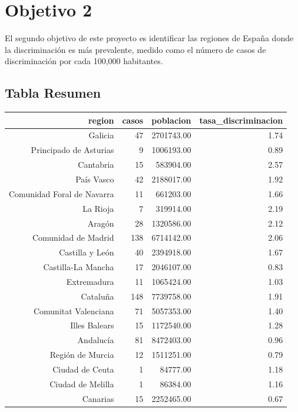 \documentclass{article}
\begin{document}
\section{Objetivo 2}
El segundo objetivo de este proyecto es identificar las regiones de España donde la discriminación es más prevalente, medido como el número de casos de discriminación por cada 100,000 habitantes.

\subsection{Tabla Resumen}
\begin{table}[ht]
\centering
\begin{tabular}{rrrr}
  \hline
region & casos & poblacion & tasa\_discriminacion \\ 
  \hline
Galicia &  47 & 2701743.00 & 1.74 \\ 
  Principado de Asturias &   9 & 1006193.00 & 0.89 \\ 
  Cantabria &  15 & 583904.00 & 2.57 \\ 
  País Vasco &  42 & 2188017.00 & 1.92 \\ 
  Comunidad Foral de Navarra &  11 & 661203.00 & 1.66 \\ 
  La Rioja &   7 & 319914.00 & 2.19 \\ 
  Aragón &  28 & 1320586.00 & 2.12 \\ 
  Comunidad de Madrid & 138 & 6714142.00 & 2.06 \\ 
  Castilla y León &  40 & 2394918.00 & 1.67 \\ 
  Castilla-La Mancha &  17 & 2046107.00 & 0.83 \\ 
  Extremadura &  11 & 1065424.00 & 1.03 \\ 
  Cataluña & 148 & 7739758.00 & 1.91 \\ 
  Comunitat Valenciana &  71 & 5057353.00 & 1.40 \\ 
  Illes Balears &  15 & 1172540.00 & 1.28 \\ 
  Andalucía &  81 & 8472403.00 & 0.96 \\ 
  Región de Murcia &  12 & 1511251.00 & 0.79 \\ 
  Ciudad de Ceuta &   1 & 84777.00 & 1.18 \\ 
  Ciudad de Melilla &   1 & 86384.00 & 1.16 \\ 
  Canarias &  15 & 2252465.00 & 0.67 \\ 
   \hline
\end{tabular}
\end{table}
\end{document}

